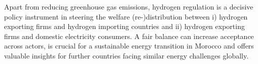 Apart from reducing greenhouse gas emissions, hydrogen regulation is a decisive policy instrument in steering the welfare (re-)distribution between i) hydrogen exporting firms and hydrogen importing countries and ii) hydrogen exporting firms and domestic electricity consumers. 
A fair balance can increase acceptance across actors, is crucial for a sustainable energy transition in Morocco and offers valuable insights for further countries facing similar energy challenges globally.





